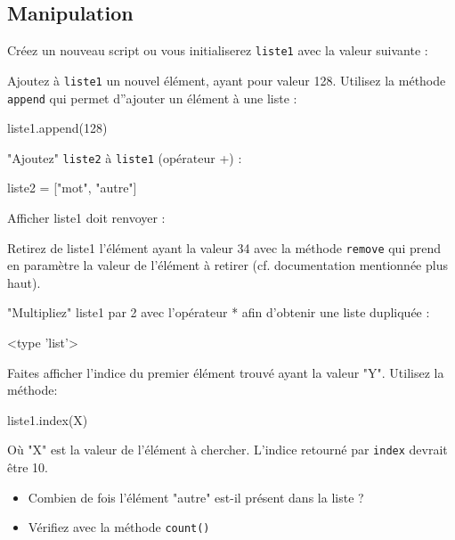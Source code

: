 \subsection{Manipulation}

\exer

Créez un nouveau script ou vous initialiserez \texttt{liste1} avec la valeur suivante :
\begin{python}
[1, 2, 3, 4, 5, 65, 34, 6, 'B', 43, 'A', 'Y', 54, 'P']
\end{python}

Ajoutez à \texttt{liste1} un nouvel élément, ayant pour valeur 128. Utilisez la méthode \texttt{append} qui permet d''ajouter un élément à une liste :

\begin{python}
liste1.append(128)
\end{python}

 "Ajoutez" \texttt{liste2} à \texttt{liste1} (opérateur +) :

\begin{python}
liste2 = ["mot", "autre"]
\end{python}

Afficher liste1 doit renvoyer :

\begin{python}
\end{python}

 Retirez de liste1 l'élément ayant la valeur 34 avec la méthode \texttt{remove} qui prend en paramètre la valeur de l'élément à retirer (cf. documentation mentionnée plus haut).

 "Multipliez" liste1 par 2 avec l'opérateur * afin d'obtenir une liste dupliquée :

\begin{python}
 <type 'list'>
\end{python}

Faites afficher l'indice du premier élément trouvé ayant la valeur "Y". Utilisez la méthode:

\begin{python}
 liste1.index(X)
\end{python}

 Où "X" est la valeur de l'élément à chercher. L'indice retourné par \texttt{index} devrait être 10.

\begin{itemize}
\item Combien de fois l'élément "autre" est-il présent dans la liste ?
\item Vérifiez avec la méthode \texttt{count()}
\end{itemize}

